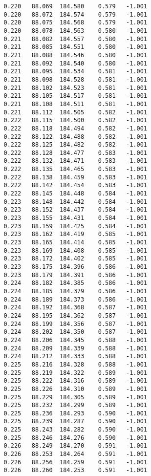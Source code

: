 \begin{verbatim}
   0.220   88.069  184.580    0.579   -1.001
   0.220   88.072  184.574    0.579   -1.001
   0.220   88.075  184.568    0.579   -1.001
   0.220   88.078  184.563    0.580   -1.001
   0.221   88.082  184.557    0.580   -1.001
   0.221   88.085  184.551    0.580   -1.001
   0.221   88.088  184.546    0.580   -1.001
   0.221   88.092  184.540    0.580   -1.001
   0.221   88.095  184.534    0.581   -1.001
   0.221   88.098  184.528    0.581   -1.001
   0.221   88.102  184.523    0.581   -1.001
   0.221   88.105  184.517    0.581   -1.001
   0.221   88.108  184.511    0.581   -1.001
   0.221   88.112  184.505    0.582   -1.001
   0.222   88.115  184.500    0.582   -1.001
   0.222   88.118  184.494    0.582   -1.001
   0.222   88.122  184.488    0.582   -1.001
   0.222   88.125  184.482    0.582   -1.001
   0.222   88.128  184.477    0.583   -1.001
   0.222   88.132  184.471    0.583   -1.001
   0.222   88.135  184.465    0.583   -1.001
   0.222   88.138  184.459    0.583   -1.001
   0.222   88.142  184.454    0.583   -1.001
   0.222   88.145  184.448    0.584   -1.001
   0.223   88.148  184.442    0.584   -1.001
   0.223   88.152  184.437    0.584   -1.001
   0.223   88.155  184.431    0.584   -1.001
   0.223   88.159  184.425    0.584   -1.001
   0.223   88.162  184.419    0.585   -1.001
   0.223   88.165  184.414    0.585   -1.001
   0.223   88.169  184.408    0.585   -1.001
   0.223   88.172  184.402    0.585   -1.001
   0.223   88.175  184.396    0.586   -1.001
   0.223   88.179  184.391    0.586   -1.001
   0.224   88.182  184.385    0.586   -1.001
   0.224   88.185  184.379    0.586   -1.001
   0.224   88.189  184.373    0.586   -1.001
   0.224   88.192  184.368    0.587   -1.001
   0.224   88.195  184.362    0.587   -1.001
   0.224   88.199  184.356    0.587   -1.001
   0.224   88.202  184.350    0.587   -1.001
   0.224   88.206  184.345    0.588   -1.001
   0.224   88.209  184.339    0.588   -1.001
   0.224   88.212  184.333    0.588   -1.001
   0.225   88.216  184.328    0.588   -1.001
   0.225   88.219  184.322    0.589   -1.001
   0.225   88.222  184.316    0.589   -1.001
   0.225   88.226  184.310    0.589   -1.001
   0.225   88.229  184.305    0.589   -1.001
   0.225   88.232  184.299    0.589   -1.001
   0.225   88.236  184.293    0.590   -1.001
   0.225   88.239  184.287    0.590   -1.001
   0.225   88.243  184.282    0.590   -1.001
   0.225   88.246  184.276    0.590   -1.001
   0.226   88.249  184.270    0.591   -1.001
   0.226   88.253  184.264    0.591   -1.001
   0.226   88.256  184.259    0.591   -1.001
   0.226   88.260  184.253    0.591   -1.001

\end{verbatim}
